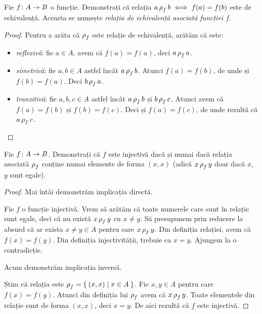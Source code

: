 \begin{exercise}
Fie \(f \colon A \to B\) o funcție. Demonstrați că relația \(a \operatorname{\rho}_f b \iff f(a) = f(b)\) este de echivalență. Aceasta se numește \emph{relația de echivalență asociată funcției \(f\)}.
\end{exercise}
\begin{proof}
Pentru a arăta că \(\operatorname{\rho}_f\) este relație de echivalență, arătăm că este:
\begin{itemize}
    \item \emph{reflexivă}: fie \(a \in A\), avem că \(f(a) = f(a)\), deci \(a \operatorname{\rho}_f a\).
    \item \emph{simetrică}: fie \(a, b \in A\) astfel încât \(a \operatorname{\rho}_f b\). Atunci \(f(a) = f(b)\), de unde și \(f(b) = f(a)\). Deci \(b \operatorname{\rho}_f a\).
    \item \emph{tranzitivă}: fie \(a, b, c \in A\) astfel încât \(a \operatorname{\rho}_f b\) și \(b \operatorname{\rho}_f c\). Atunci avem că \(f(a) = f(b)\) și \(f(b) = f(c)\). Deci și \(f(a) = f(c)\), de unde rezultă că \(a \operatorname{\rho}_f c\).
\end{itemize}
\end{proof}

\begin{exercise}
Fie \(f \colon A \to B\).
Demonstrați că \(f\) este injectivă dacă și numai dacă relația asociată \(\operatorname{\rho}_f\) conține numai elemente de forma \((x, x)\) (adică \(x \operatorname{\rho}_f y\) doar dacă \(x\), \(y\) sunt egale).
\end{exercise}
\begin{proof}
Mai întâi demonstrăm implicația directă.

Fie \(f\) o funcție injectivă. Vrem să arătăm că toate numerele care sunt în relație sunt egale, deci că nu există \(x \operatorname{\rho}_f y\) cu \(x \neq y\). Să presupunem prin reducere la absurd că ar exista \(x \neq y \in A\) pentru care \(x \operatorname{\rho}_f y\). Din definiția relației, avem că \(f(x) = f(y)\). Din definiția injectivității, trebuie ca \(x = y\). Ajungem la o contradicție.

Acum demonstrăm implicația inversă.

Știm că relația este \(\operatorname{\rho}_f = \Set{ (x, x) | x \in A }\).
Fie \(x, y \in A\) pentru care \(f(x) = f(y)\). Atunci din definiția lui \(\operatorname{\rho}_f\) avem că \(x \operatorname{\rho}_f y\). Toate elementele din relație sunt de forma \((x, x)\), deci \(x = y\). De aici rezultă că \(f\) este injectivă.
\end{proof}

